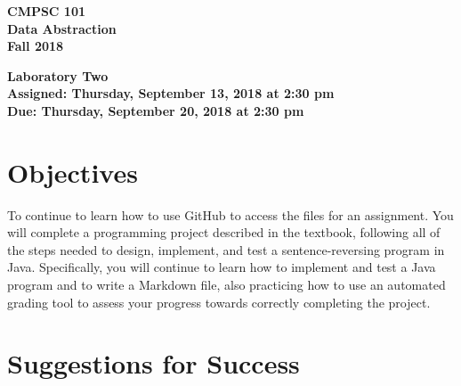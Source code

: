 \documentclass[11pt]{article}
\newcommand{\assignmentduedate}{September 20}
\newcommand{\assignmentassignedate}{September 13}
\newcommand{\assignmentnumber}{Two}
\newcommand{\labyear}{2018}
\newcommand{\labday}{Thursday}
\newcommand{\labtime}{2:30 pm}
\newcommand{\assigneddate}{Assigned: \labday, \assignmentassignedate, \labyear{} at \labtime{}}
\newcommand{\duedate}{Due: \labday, \assignmentduedate, \labyear{} at \labtime{}}
\newcommand{\labtitle}[1]
{
  \begin{center}
    \begin{center}
      \bf
      CMPSC 101\\Data Abstraction\\
      Fall 2018\\
      \medskip
    \end{center}
    \bf
    #1
  \end{center}
}
\begin{document}
\thispagestyle{empty}

\labtitle{Laboratory \assignmentnumber{} \\ \assigneddate{} \\ \duedate{}}

\section*{Objectives}

To continue to learn how to use GitHub to access the files for an assignment.
You will complete a programming project described in the textbook, following all
of the steps needed to design, implement, and test a sentence-reversing program
in Java. Specifically, you will continue to learn how to implement and test a
Java program and to write a Markdown file, also practicing how to use an
automated grading tool to assess your progress towards correctly completing the
project.

\section*{Suggestions for Success}
\end{document}
